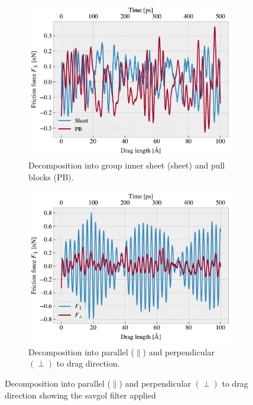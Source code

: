 \begin{figure}[H]
  \centering
  \begin{subfigure}[b]{0.49\textwidth}
    \centering
    \includegraphics[width=\textwidth]{figures/baseline/decomp_group.pdf}
    \caption{Decomposition into group inner sheet (sheet) and pull blocks (PB).}
    \label{fig:decomp_group}
  \end{subfigure}
  \hfill
  \begin{subfigure}[b]{0.49\textwidth}
      \centering
      \includegraphics[width=\textwidth]{figures/baseline/decomp_direc.pdf}
      \caption{Decomposition into parallel ($\parallel$) and perpendicular $(\perp)$ to drag direction.}
      \label{fig:decomp_direc}
  \end{subfigure}
  \caption{Decomposition into parallel ($\parallel$) and perpendicular $(\perp)$ to drag direction showing the savgol filter applied}
  \label{fig:decomp}
\end{figure}


